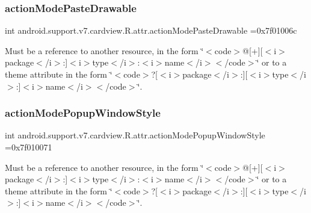 \subsubsection{\texorpdfstring{action\+Mode\+Paste\+Drawable}{actionModePasteDrawable}}
{\footnotesize\ttfamily int android.\+support.\+v7.\+cardview.\+R.\+attr.\+action\+Mode\+Paste\+Drawable =0x7f01006c\hspace{0.3cm}{\ttfamily [static]}}

Must be a reference to another resource, in the form \char`\"{}$<$code$>$@\mbox{[}+\mbox{]}\mbox{[}$<$i$>$package$<$/i$>$\+:\mbox{]}$<$i$>$type$<$/i$>$\+:$<$i$>$name$<$/i$>$$<$/code$>$\char`\"{} or to a theme attribute in the form \char`\"{}$<$code$>$?\mbox{[}$<$i$>$package$<$/i$>$\+:\mbox{]}\mbox{[}$<$i$>$type$<$/i$>$\+:\mbox{]}$<$i$>$name$<$/i$>$$<$/code$>$\char`\"{}. \mbox{\label{classandroid_1_1support_1_1v7_1_1cardview_1_1R_1_1attr_a5b58730faf2ff2f5aba8da289ef2570b}} 
\subsubsection{\texorpdfstring{action\+Mode\+Popup\+Window\+Style}{actionModePopupWindowStyle}}
{\footnotesize\ttfamily int android.\+support.\+v7.\+cardview.\+R.\+attr.\+action\+Mode\+Popup\+Window\+Style =0x7f010071\hspace{0.3cm}{\ttfamily [static]}}

Must be a reference to another resource, in the form \char`\"{}$<$code$>$@\mbox{[}+\mbox{]}\mbox{[}$<$i$>$package$<$/i$>$\+:\mbox{]}$<$i$>$type$<$/i$>$\+:$<$i$>$name$<$/i$>$$<$/code$>$\char`\"{} or to a theme attribute in the form \char`\"{}$<$code$>$?\mbox{[}$<$i$>$package$<$/i$>$\+:\mbox{]}\mbox{[}$<$i$>$type$<$/i$>$\+:\mbox{]}$<$i$>$name$<$/i$>$$<$/code$>$\char`\"{}. \mbox{\label{classandroid_1_1support_1_1v7_1_1cardview_1_1R_1_1attr_a3fe0b7c91a38d7caf797cc0211079d06}} 
